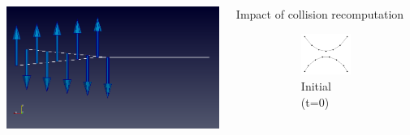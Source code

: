 \documentclass[aspectratio=1610,t,10pt]{beamer}
\begin{document}
\begin{frame}
\begin{columns}[t]
\begin{column}{.48\textwidth}
\begin{minipage}{0.49\linewidth}
			
			\includegraphics[width=\linewidth]{img/expected} 
		\end{minipage}			
	\end{column}
	\begin{column}{.48\textwidth}
		\begin{block}{Impact of collision recomputation}
		\centering		
		\begin{figure}
			\centering
			\begin{subfigure}[t]{0.48\textwidth}
				\centering
				\includegraphics[width=0.8\linewidth]{img/res-collision/disloc-plot-1}
				\caption{Initial (t=0)}
			\end{subfigure}
			\begin{subfigure}[t]{0.48\textwidth}
				\centering

\end{subfigure}
\end{figure}
\end{block}
\end{column}
\end{columns}
\end{frame}
\end{document}
